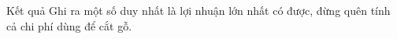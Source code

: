 Kết quả  
Ghi ra một số duy nhất là lợi nhuận lớn nhất có được, đừng quên tính cả chi phí dùng để cắt gỗ.